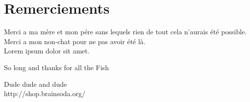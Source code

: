 \backmatter

\chapter*{\center \huge Remerciements}
Merci a ma mère et mon pére sans lequels rien de tout cela n'aurais été possible. Merci a mon non-chat pour ne pas avoir été là.\\
Lorem ipsum dolor sit amet.


So long and thanks for all the Fish


\begin{thebibliography}{99}
  
Dude dude and dude \\
http://shop.brainsoda.org/
 
\end{thebibliography}
